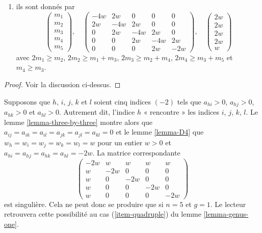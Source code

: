 \begin{lemma}
\begin{enumerate}
$$\begin{matrix}
w \\
w \\
w \\
w \\
2w
\end{matrix}
\right)
$$
avec $2m_1 \geq m_2$, $2m_2 \geq m_1 + m_3$, $2m_3 \geq m_2 + 2m_4$,
$2m_4 \geq m_3 + m_5$ et $2m_5 \geq m_4$, ou
\item
\label{item-B5}
ils sont donnés par
$$
\left(
\begin{matrix}
m_1 \\
m_2 \\
m_3 \\
m_4 \\
m_5
\end{matrix}
\right),
\quad
\left(
\begin{matrix}
-4w & 2w & 0 & 0 & 0 \\
2w & -4w & 2w & 0 & 0 \\
0 & 2w & -4w & 2w & 0 \\
0 & 0 & 2w & -4w & 2w \\
0 & 0 & 0 & 2w & -2w
\end{matrix}
\right),
\quad
\left(
\begin{matrix}
2w \\
2w \\
2w \\
2w \\
w
\end{matrix}
\right)
$$
avec $2m_1 \geq m_2$, $2m_2 \geq m_1 + m_3$, $2m_3 \geq m_2 + m_4$,
$2m_4 \geq m_3 + m_5$ et $m_4 \geq m_3$.
\end{enumerate}
\end{lemma}

\begin{proof}
Voir la discussion ci-dessus.
\end{proof}

\noindent
Supposons que $h$, $i$, $j$, $k$ et $l$ soient cinq indices $(-2)$
tels que $a_{hi} > 0$, $a_{hj} > 0$, $a_{hk} > 0$ et $a_{hl} > 0$.
Autrement dit, l'indice $h$ « rencontre » les indices
$i$, $j$, $k$, $l$. Le lemme \ref{lemma-three-by-three} montre alors
que $a_{ij} = a_{ik} = a_{il} = a_{jk} = a_{jl} = a_{kl} = 0$ et
le lemme \ref{lemma-D4} que
$w_h = w_i = w_j = w_k = w_l = w$ pour un entier $w > 0$ et
$a_{hi} = a_{hj} = a_{hk} = a_{hl} = -2w$.
La matrice correspondante
$$
\left(
\begin{matrix}
-2w & w & w & w & w \\
w & -2w & 0 & 0 & 0 \\
w & 0 & -2w & 0 & 0 \\
w & 0 & 0 & -2w & 0 \\
w & 0 & 0 & 0 & -2w
\end{matrix}
\right)
$$
est singulière. Cela ne peut donc se produire que si $n = 5$ et $g = 1$.
Le lecteur retrouvera cette possibilité au cas
(\ref{item-quadruple}) du lemme \ref{lemma-genus-one}.

